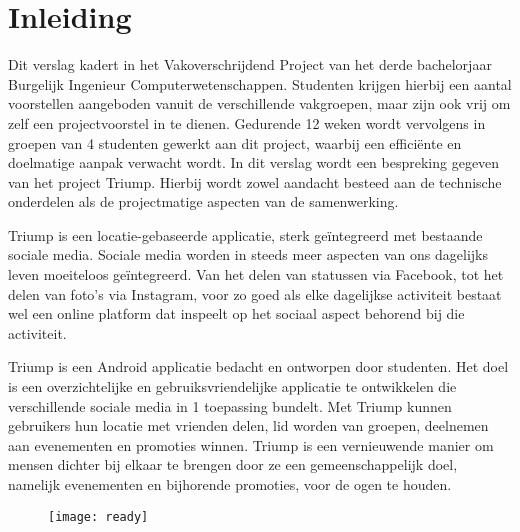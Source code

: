 \chapter{Inleiding}
Dit verslag kadert in het Vakoverschrijdend Project van het derde bachelorjaar Burgelijk Ingenieur Computerwetenschappen. Studenten krijgen hierbij een aantal voorstellen aangeboden vanuit de verschillende vakgroepen, maar zijn ook vrij om zelf een projectvoorstel in te dienen. Gedurende 12 weken wordt vervolgens in groepen van 4 studenten gewerkt aan dit project, waarbij een efficiënte en doelmatige aanpak verwacht wordt. In dit verslag wordt een bespreking gegeven van het project Triump. Hierbij wordt zowel aandacht besteed aan de technische onderdelen als de projectmatige aspecten van de samenwerking.

Triump is een locatie-gebaseerde applicatie, sterk geïntegreerd met bestaande sociale media. Sociale media worden in steeds meer aspecten van ons dagelijks leven moeiteloos geïntegreerd. Van het delen van statussen via Facebook, tot het delen van foto’s via Instagram, voor zo goed als elke dagelijkse activiteit bestaat wel een online platform dat inspeelt op het sociaal aspect behorend bij die activiteit.

Triump is een Android applicatie bedacht en ontworpen door studenten. Het doel is een overzichtelijke en gebruiksvriendelijke applicatie te ontwikkelen die verschillende sociale media in 1 toepassing bundelt. Met Triump kunnen gebruikers hun locatie met vrienden delen, lid worden van groepen, deelnemen aan evenementen en promoties winnen. Triump is een vernieuwende manier om mensen dichter bij elkaar te brengen door ze een gemeenschappelijk doel, namelijk evenementen en bijhorende promoties, voor de ogen te houden.


\begin{figure}[H]
	\centering
	\texttt{[image: ready]}
	\label{fig:inleiding}
\end{figure}
